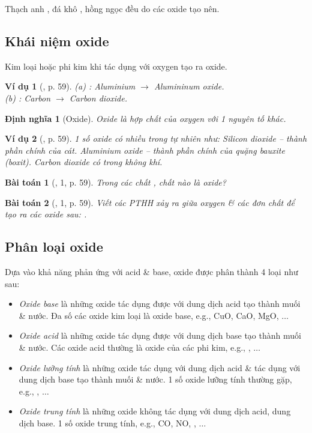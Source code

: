\documentclass{article}
\newtheorem{baitoan}{Bài toán}
\newtheorem{dinhnghia}{Định nghĩa}
\newtheorem{vidu}{Ví dụ}
\begin{document}
Thạch anh , đá khô , hồng ngọc  đều do các oxide tạo nên.

\subsection{Khái niệm oxide}
Kim loại hoặc phi kim khi tác dụng với oxygen tạo ra oxide.

\begin{vidu}[\cite{SGK_KHTN_8_Canh_Dieu}, p. 59]
	(a) \emph{}: Aluminium $\to$ Alumininum oxide.\\(b) \emph{}: Carbon $\to$ Carbon dioxide.
\end{vidu}

\begin{dinhnghia}[Oxide]
	\emph{Oxide} là hợp chất của oxygen với 1 nguyên tố khác.
\end{dinhnghia}

\begin{vidu}[\cite{SGK_KHTN_8_Canh_Dieu}, p. 59]
	1 số oxide có nhiều trong tự nhiên như: Silicon dioxide \emph{} -- thành phần chính của cát. Aluminium oxide \emph{} -- thành phần chính của quặng bauxite (boxit). Carbon dioxide \emph{} có trong không khí.
\end{vidu}

\begin{baitoan}[\cite{SGK_KHTN_8_Canh_Dieu}, 1, p. 59]
	Trong các chất \emph{}, chất nào là oxide?
\end{baitoan}

\begin{baitoan}[\cite{SGK_KHTN_8_Canh_Dieu}, 1, p. 59]
	Viết các PTHH xảy ra giữa oxygen \& các đơn chất để tạo ra các oxide sau: \emph{}.
\end{baitoan}

\subsection{Phân loại oxide}
Dựa vào khả năng phản ứng với acid \& base, oxide được phân thành 4 loại như sau:
\begin{itemize}
	\item \textit{Oxide base} là những oxide tác dụng được với dung dịch acid tạo thành muối \& nước. Đa số các oxide kim loại là oxide base, e.g., CuO, CaO, MgO, $\ldots$
	\item \textit{Oxide acid} là những oxide tác dụng được với dung dịch base tạo thành muối \& nước. Các oxide acid thường là oxide của các phi kim, e.g., , $\ldots$
	\item \textit{Oxide lưỡng tính} là những oxide tác dụng với dung dịch acid \& tác dụng với dung dịch base tạo thành muối \& nước. 1 số oxide lưỡng tính thường gặp, e.g., , $\ldots$
	\item \textit{Oxide trung tính} là những oxide không tác dụng với dung dịch acid, dung dịch base. 1 số oxide trung tính, e.g., CO, NO, , $\ldots$
\end{itemize}
\end{document}

